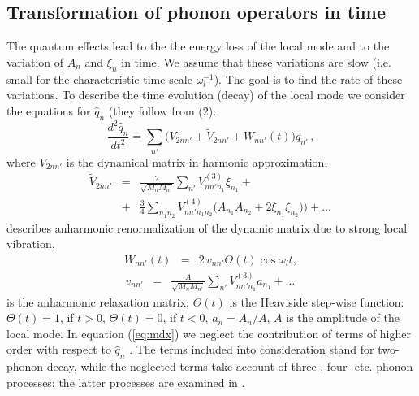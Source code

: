\subsection{Transformation of phonon operators in time}
The quantum effects lead to the the energy 
loss of the local mode and to the variation of $A_{n}$ and $\xi_{n}$ in time. 
We assume that these variations are slow (i.e. small for the characteristic 
time scale $\omega_{l}^{-1}$). The goal is to find the rate of these 
variations. To describe the time evolution (decay) of the local mode 
we consider the equations for $\hat{q}_{n}$ (they follow from (2):
\begin{equation}
\frac{d^{2} \hat{q}_{n}}{d t^{2}} = 
\sum_{n'}{{\big (}V_{2 n n'}+\tilde{V}_{2 n n'}+ 
W_{n n'}(t){\big )}\hat{q}_{n'}}\,,
\label{eq:mdx}
\end{equation}
where $V_{2 n n'}$ is the dynamical matrix in harmonic approximation,
\begin{eqnarray}
\tilde{V}_{2 n n'} & = & \frac{2}{\sqrt{M_{n} M_{n'}}}
\sum_{n'}{V^{(3)}_{n n' n_1}\xi_{n_1}} + \nonumber \\
& + & \frac{3}{4} \sum_{n_{1} n_{2}}{V^{(4)}_{n n'n_{1} n_{2}}{\big
(}A_{n_{1}} A_{n_{2}} + 2\xi_{n_{1}} \xi_{n_{2}}{\big )}}{\Big )} 
+ \ldots\, 
\end{eqnarray} 
describes anharmonic renormalization of the dynamic matrix 
due to strong local vibration,
\begin{eqnarray}
W_{n n'}(t)  & = & 2\,v_{n n'}\Theta(t) \cos{\omega_{l} t} ,
\end{eqnarray}
\begin{eqnarray}
v_{n n'} & = & \frac{A}{\sqrt{M_{n} M_{n'}}}
\sum_{n'}{V^{(3)}_{nn'n_{1}} a_{n_{1}}}+\ldots\,
\end{eqnarray}
is the anharmonic relaxation matrix; $\Theta (t)$ is the Heaviside 
step-wise function: $\Theta(t) =1$, if $t>0$, $\Theta(t) = 0$, if $t<0$, 
$a_n=A_n/A$, $A$ is the amplitude of the local mode.
In equation (\ref{eq:mdx}) we neglect the contribution of terms of higher
order with respect to $\hat{q}_{n}$ . The terms included into consideration 
stand for two-phonon decay, while the neglected terms take account of three-,
four- etc. phonon processes; the latter processes are examined in 
\cite{zhizh}.

